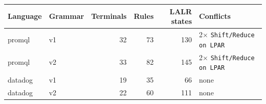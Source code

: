 \begin{tabular}{@{}llrrrl@{}}
\toprule
Language & Grammar & Terminals & Rules & LALR states & Conflicts \\
\midrule
promql & v1 & 32 & 73 & 130 & 2$\times$ \texttt{Shift/Reduce on LPAR} \\
promql & v2 & 33 & 82 & 145 & 2$\times$ \texttt{Shift/Reduce on LPAR} \\
datadog & v1 & 19 & 35 & 66 & none \\
datadog & v2 & 22 & 60 & 111 & none \\
\bottomrule
\end{tabular}

